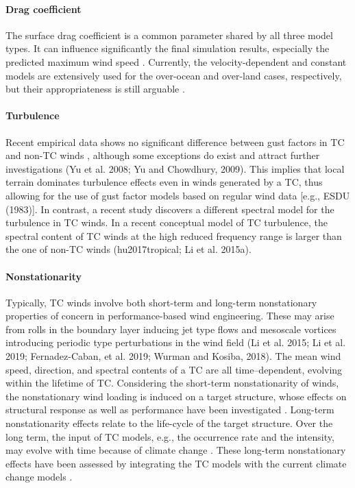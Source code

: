 \paragraph{Drag coefficient} The surface drag coefficient is a common parameter shared by all three model types. It can influence significantly the final simulation results, especially the predicted maximum wind speed \citep{li2015observations, powell2003reduced}. Currently, the velocity-dependent and constant models are extensively used for the over-ocean and over-land cases, respectively, but their appropriateness is still arguable \citep{smith2014sensitivity}. 

\paragraph{Turbulence} Recent empirical data shows no significant difference between gust factors in TC and non-TC winds \citep{vickery2009hurricane-a}, although some exceptions do exist and attract further investigations (Yu et al. 2008; Yu and Chowdhury, 2009). This implies that local terrain dominates turbulence effects even in winds generated by a TC, thus allowing for the use of gust factor models based on regular wind data [e.g., ESDU (1983)]. In contrast, a recent study discovers a different spectral model for the turbulence in TC winds. In a recent conceptual model of TC turbulence, the spectral content of TC winds at the high reduced frequency range is larger than the one of non-TC winds (hu2017tropical; Li et al. 2015a).

\paragraph{Nonstationarity} Typically, TC winds involve both short-term and long-term nonstationary properties of concern in performance-based wind engineering. These may arise from rolls in the boundary layer inducing jet type flows and mesoscale vortices introducing periodic type perturbations in the wind field (Li et al. 2015; Li et al. 2019; Fernadez-Caban, et al. 2019; Wurman and Kosiba, 2018). The mean wind speed, direction, and spectral contents of a TC are all time–dependent, evolving within the lifetime of TC. Considering the short-term nonstationarity of winds, the nonstationary wind loading is induced on a target structure, whose effects on structural response as well as performance have been investigated \citep{kareem2018generalized, kwon2009gustfront, yau2011hurricane}. Long-term nonstationarity effects relate to the life-cycle of the target structure. Over the long term, the input of TC models, e.g., the occurrence rate and the intensity, may evolve with time because of climate change \citep{emanuel2005increasing}. These long-term nonstationary effects have been assessed by integrating the TC models with the current climate change models \citep{emanuel2008hurricanes,lauren2014assessing,lin2015integrated,liu2014projections}.

